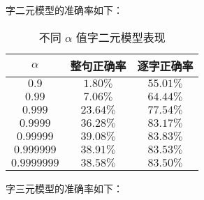 \documentclass[a4paper]{article}
\begin{document}
    字二元模型的准确率如下：

    \begin{table}[H]
        \centering
        \begin{tabular}{c|cc}
            \toprule
            \multicolumn{1}{c}{$\alpha$} & 整句正确率 & 逐字正确率 \\ \hline
            $0.9$ & $1.80\%$ & $55.01\%$ \\ \hline
            $0.99$ & $7.06\%$ & $64.44\%$ \\ \hline
            $0.999$ & $23.64\%$ & $77.54\%$ \\ \hline
            $0.9999$ & $36.28\%$ & $83.17\%$ \\ \hline
            $0.99999$ & $\pmb{39.08\%}$ & $\pmb{83.83\%}$ \\ \hline
            $0.999999$ & $38.91\%$ & $83.53\%$ \\ \hline
            $0.9999999$ & $38.58\%$ & $83.50\%$ \\
            \bottomrule
        \end{tabular}
        \caption{不同 $\alpha$ 值字二元模型表现}
	    \label{tab1}
    \end{table}

    字三元模型的准确率如下：
\end{document}
